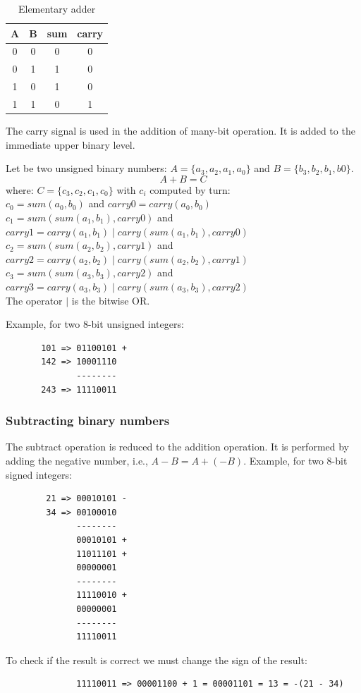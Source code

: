 {\small
\begin{table}[H]
  \begin{center}
    \caption{Elementary adder}
    \label{add}
    \begin{tabular}{|c|c||c|c|}
      \hline
      A&    B &  sum & carry     \\ \hline \hline
      0&  0&   0&       0    \\ \hline
      0&  1&   1&       0    \\ \hline
      1&  0&   1&       0    \\ \hline
      1&  1&   0&       1    \\ \hline
    \end{tabular}
  \end{center}
\end{table}
}
The carry signal is used in the addition of many-bit operation. It is added to the immediate upper binary level.

Let be two unsigned binary  numbers: $A = \{a_3, a_2, a_1, a_0\}$ and $B = \{b_3, b_2, b_1, b0\}$.
$$A + B = C$$
where: $C = \{c_3, c_2, c_1, c_0\}$ with $c_i$ computed by turn:\\
$c_0 = sum(a_0,b_0)$ and $carry0 = carry(a_0,b_0)$\\
$c_1 = sum(sum(a_1, b_1), carry0)$ and $carry1 = carry(a_1, b_1) \; | \; carry(sum(a_1, b_1), carry0)$\\
$c_2 = sum(sum(a_2, b_2), carry1)$ and $carry2 = carry(a_2, b_2) \; | \; carry(sum(a_2, b_2), carry1)$\\
$c_3 = sum(sum(a_3, b_3), carry2)$ and $carry3 = carry(a_3, b_3) \; | \; carry(sum(a_3, b_3), carry2)$\\
The operator $|$ is the bitwise OR.

Example, for two 8-bit unsigned integers:
\begin{verbatim}
       101 => 01100101 +
       142 => 10001110
              --------
       243 => 11110011
\end{verbatim}

\subsubsection{Subtracting binary numbers}

The subtract operation is reduced to the addition operation. It is performed by adding the negative number, i.e., $A - B = A + (-B)$.
Example, for two 8-bit signed integers:
\begin{verbatim}
        21 => 00010101 -
        34 => 00100010
              --------
              00010101 +
              11011101 +
              00000001
              --------
              11110010 +
              00000001
              --------
              11110011
\end{verbatim}
To check if the result is correct we must change the sign of the result:
\begin{verbatim}
              11110011 => 00001100 + 1 = 00001101 = 13 = -(21 - 34)
\end{verbatim}

